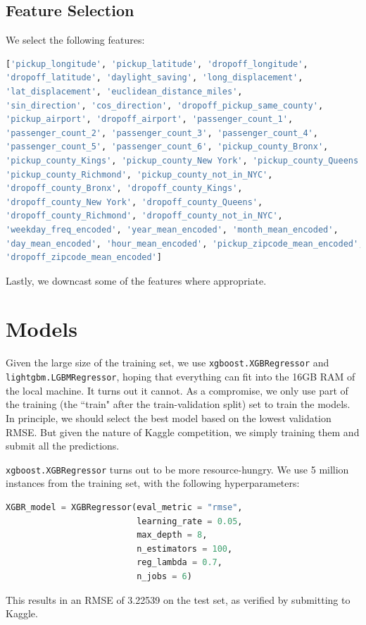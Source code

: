 \documentclass[12pt,letterpaper,final]{article}
\numberwithin{equation}{section}
\begin{document}
\subsection{Feature Selection}

We select the following features: 

\begin{lstlisting}[language=Python, basicstyle=\footnotesize]
['pickup_longitude', 'pickup_latitude', 'dropoff_longitude',
'dropoff_latitude', 'daylight_saving', 'long_displacement',
'lat_displacement', 'euclidean_distance_miles', 
'sin_direction', 'cos_direction', 'dropoff_pickup_same_county',
'pickup_airport', 'dropoff_airport', 'passenger_count_1',
'passenger_count_2', 'passenger_count_3', 'passenger_count_4',
'passenger_count_5', 'passenger_count_6', 'pickup_county_Bronx',
'pickup_county_Kings', 'pickup_county_New York', 'pickup_county_Queens',
'pickup_county_Richmond', 'pickup_county_not_in_NYC',
'dropoff_county_Bronx', 'dropoff_county_Kings',
'dropoff_county_New York', 'dropoff_county_Queens',
'dropoff_county_Richmond', 'dropoff_county_not_in_NYC',
'weekday_freq_encoded', 'year_mean_encoded', 'month_mean_encoded',
'day_mean_encoded', 'hour_mean_encoded', 'pickup_zipcode_mean_encoded',
'dropoff_zipcode_mean_encoded']
\end{lstlisting}

Lastly, we downcast some of the features where appropriate.

\section{Models}

Given the large size of the training set, we use \verb|xgboost.XGBRegressor| and \verb|lightgbm.LGBMRegressor|, hoping that everything can fit into the 16GB RAM of the local machine. It turns out it cannot. As a compromise, we only use part of the training (the ``train" after the train-validation split) set to train the models. In principle, we should select the best model based on the lowest validation RMSE. But given the nature of Kaggle competition, we simply training them and submit all the predictions.

\verb|xgboost.XGBRegressor| turns out to be more resource-hungry. We use 5 million instances from the training set, with the following hyperparameters:
\begin{lstlisting}[language=Python, basicstyle=\footnotesize]
XGBR_model = XGBRegressor(eval_metric = "rmse", 
                          learning_rate = 0.05, 
                          max_depth = 8,
                          n_estimators = 100,
                          reg_lambda = 0.7,
                          n_jobs = 6)
\end{lstlisting}
This results in an RMSE of 3.22539 on the test set, as verified by submitting to Kaggle. 
\end{document}
